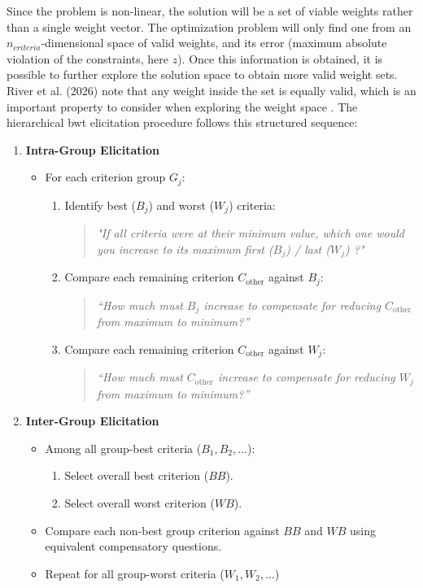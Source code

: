 Since the problem is non-linear, the solution will be a set of viable weights rather than a single weight vector. The optimization problem will only find one from an $n_{criteria}$-dimensional space of valid weights, and its error (maximum absolute violation of the constraints, here $z$). Once this information is obtained, it is possible to further explore the solution space to obtain more valid weight sets. River et al. (2026) note that any weight inside the set is equally valid, which is an important property to consider when exploring the weight space \cite{Huang2026}. The hierarchical \gls{bwt} elicitation procedure follows this structured sequence:
\begin{enumerate}
    \item \textbf{Intra-Group Elicitation}
    \begin{itemize}
        \item For each criterion group $G_j$:
        \begin{enumerate}
            \item Identify best ($B_j$) and worst ($W_j$) criteria:
            \begin{quote}
               \textit{"If all criteria were at their minimum value, which one would you increase to its maximum first ($B_j$) / last ($W_j$) ?"}
            \end{quote}
            \item Compare each remaining criterion $C_{\text{other}}$ against $B_j$:
            \begin{quote}
                \textit{``How much must $B_j$ increase to compensate for reducing $C_{\text{other}}$ from maximum to minimum?''}
            \end{quote}
            \item Compare each remaining criterion $C_{\text{other}}$ against $W_j$:
            \begin{quote}
                \textit{``How much must $C_{\text{other}}$ increase to compensate for reducing $W_j$ from maximum to minimum?''}
            \end{quote}
        \end{enumerate}
    \end{itemize}

    \item \textbf{Inter-Group Elicitation}
    \begin{itemize}
        \item Among all group-best criteria ($B_1, B_2, \dots$):
        \begin{enumerate}
            \item Select overall best criterion ($BB$).
            \item Select overall worst criterion ($WB$).
        \end{enumerate}
        \item Compare each non-best group criterion against $BB$ and $WB$ using equivalent compensatory questions.
        \item Repeat for all group-worst criteria ($W_1, W_2, \dots$)
    \end{itemize}
\end{enumerate}


